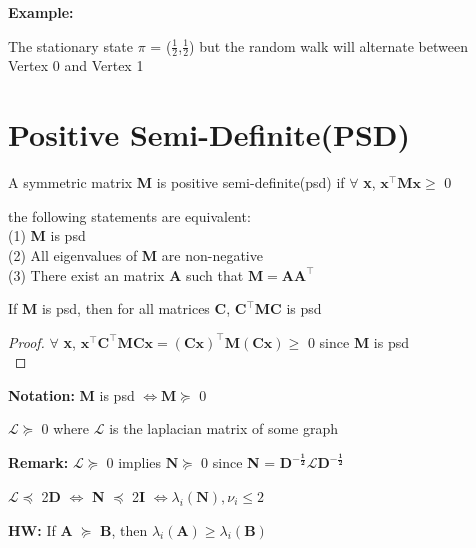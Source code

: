 \documentclass[11pt]{article}
\begin{document}
\newpage

\textbf{Example:}\\

The stationary state $\pi$ = ($\frac{1}{2}$,$\frac{1}{2}$) but the random walk will alternate between Vertex 0 and Vertex 1\\

\section{Positive Semi-Definite(PSD)}

\begin{definition}
    A symmetric matrix \textbf{M} is positive semi-definite(psd) if $\forall$ \textbf{x}, $\mathbf{x^\top Mx \geq}$ 0
\end{definition}

\begin{theorem}
     the following statements are equivalent:\\
(1) \textbf{M} is psd\\
(2) All eigenvalues of \textbf{M} are non-negative\\
(3) There exist an matrix \textbf{A} such that $\mathbf{M = AA^\top}$\\
\end{theorem}

\begin{lemma}
    If \textbf{M} is psd, then for all matrices \textbf{C}, $\mathbf{C^\top}$\textbf{MC} is psd\\
\end{lemma} 
\begin{proof}
$\forall$ \textbf{x}, $\mathbf{x^\top C^\top MCx = (Cx)^\top M(Cx) \geq}$ 0 since \textbf{M} is psd\\
\end{proof}
\textbf{Notation:} \textbf{M} is psd $\Leftrightarrow \mathbf{M \succeq}$ 0
\begin{lemma}
    $\mathbf{\mathcal{L}} \succeq$ 0 where $\mathbf{\mathcal{L}}$ is the laplacian matrix of some graph
\end{lemma}
\textbf{Remark:} $\mathbf{\mathcal{L}} \succeq$ 0 implies $\mathbf{N} \succeq$ 0 since \textbf{N} = $\mathbf{D^{-\frac{1}{2}}\mathcal{L}D^{-\frac{1}{2}}}$
\begin{lemma}
    $\mathbf{\mathcal{L}} \preccurlyeq$ 2\textbf{D} $\Leftrightarrow$ \textbf{N} $\preccurlyeq$ 2\textbf{I} $\Leftrightarrow \lambda_i(\mathbf{N}), \nu_i \leq 2$ 
\end{lemma} 
\textbf{HW:} If \textbf{A} $\succeq$ \textbf{B}, then $\lambda_i(\mathbf{A}) \geq \lambda_i(\mathbf{B})$\\
\end{document}
